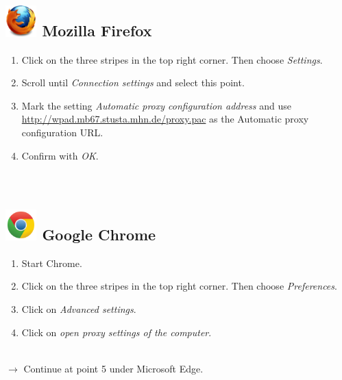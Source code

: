 \documentclass[a4paper,12pt]{scrartcl}
\begin{document}
\subsection*{\includegraphics[height=1.2cm,keepaspectratio]{Bilder/Firefox_35_logo} Mozilla Firefox}
\begin{enumerate}
	\item Click on the three stripes in the top right corner. Then choose \emph{Settings}.
	\item Scroll until \emph{Connection settings} and select this point.
	\item Mark the setting \emph{Automatic proxy configuration address} and use \\ \url{http://wpad.mb67.stusta.mhn.de/proxy.pac} as the Automatic proxy configuration URL.
	\item Confirm with \emph{OK}.\\
	\\
	\\
\end{enumerate}



\subsection*{\includegraphics[height=1.2cm,keepaspectratio]{Bilder/Chrome_2011_logo} Google Chrome}
\begin{enumerate}
	\item Start Chrome.
	\item Click on the three stripes in the top right corner. Then choose \emph{Preferences}.
	\item Click on \emph{Advanced settings}.
	\item Click on \emph{open proxy settings of the computer}.
	\\
	\\
\end{enumerate}
$\rightarrow$ Continue at point 5 under Microsoft Edge.
\end{document}
